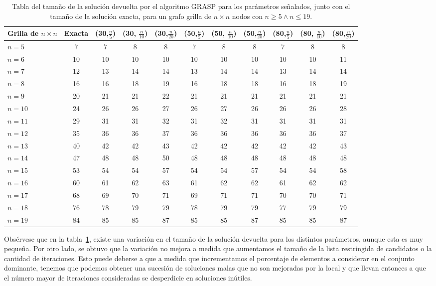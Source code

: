 \begin{table}
	\caption{Tabla del tama\~no de la soluci\'on devuelta por el 
	algoritmo GRASP para los par\'ametros se\~nalados, junto con el
	tama\~no de la soluci\'on exacta, para un grafo grilla de 
	$n \times n$ nodos con $n \geq 5 \wedge n \leq 19$.}
	\label{tab::grasp}
	\centering
	\resizebox{0.9\textwidth}{!} {
	\begin{tabular}{l | c | c c c | c c c | c c c}
		Grilla de $n \times n$ & Exacta & (30,$\frac{n}{5}$) & (30, $\frac{n}{10}$) & (30,$\frac{n}{20}$) &  
		(50,$\frac{n}{5}$) & (50, $\frac{n}{10}$) & (50,$\frac{n}{20}$) & (80,$\frac{n}{5}$) & (80, $\frac{n}{10}$) & (80,$\frac{n}{20}$) \\ \hline
		$n = 5$ & 7 & 7 & 8 & 8 & 7 & 8 & 8 & 7 & 8 & 8 \\
		$n = 6$ & 10 & 10 & 10 & 10 & 10 & 10 & 10 & 10 & 10 & 11 \\
		$n = 7$ & 12 & 13 & 14 & 14 & 13 & 14 & 14 & 13 & 14 & 14 \\
		$n = 8$ & 16 & 16 & 18 & 19 & 16 & 18 & 18 & 16 & 18 & 19 \\
		$n = 9$ & 20 & 21 & 21 & 22 & 21 & 21 &  21 & 21 & 21 & 21 \\
		$n = 10$ & 24 & 26 & 26 & 27 & 26 & 27 & 26 & 26 & 26 & 28 \\
		$n = 11$ & 29 & 31 & 31 & 32 & 31 & 32 & 31 & 31 & 31 & 31 \\
		$n = 12$ & 35 & 36 & 36 & 37 & 36 & 36 & 36 & 36 & 36 & 37 \\
		$n = 13$ & 40 & 42 & 42 & 43 & 42 & 42 & 42 & 42 & 42 & 43 \\
		$n = 14$ & 47 & 48 & 48 & 50 & 48 & 48 & 48 & 48 & 48 & 48 \\
		$n = 15$ & 53 & 54 & 54 & 57 & 54 & 54 & 57 & 54 & 54 & 58 \\
		$n = 16$ & 60 & 61 & 62 & 63 & 61 & 62 & 62 & 61 & 62 & 62 \\
		$n = 17$ & 68 & 69 & 70 & 71 & 69 & 71 & 71 & 70 & 70 & 71 \\
		$n = 18$ & 76 & 78 & 79 & 79 & 78 & 79 & 79 & 77 & 79 & 79 \\
		$n = 19$ & 84 & 85 & 85 & 87 & 85 & 85 & 87 & 85 & 85 & 87
	\end{tabular}
	}
\end{table}

Obs\'ervese que en la tabla~\ref{tab::grasp}, existe una variaci\'on en el
tama\~no de la soluci\'on devuelta para los distintos par\'ametros, 
aunque esta es muy peque\~na. Por otro lado, se obtuvo que la 
variaci\'on no mejora a medida que aumentamos el tama\~no de la lista
restringida de candidatos o la cantidad de iteraciones. Esto puede 
deberse a que a medida que incrementamos el porcentaje de elementos
a considerar en el conjunto dominante, tenemos que podemos obtener una
sucesi\'on de soluciones malas que no son mejoradas por la local y que 
llevan entonces a que el n\'umero mayor de iteraciones consideradas se 
desperdicie en soluciones in\'utiles.

